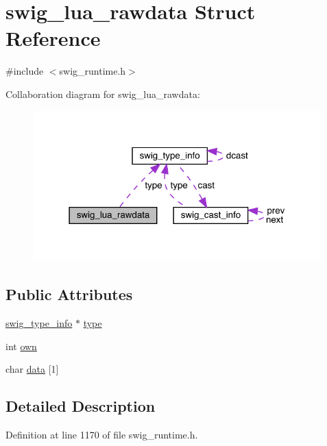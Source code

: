 \hypertarget{structswig__lua__rawdata}{}\section{swig\+\_\+lua\+\_\+rawdata Struct Reference}
\label{structswig__lua__rawdata}


{\ttfamily \#include $<$swig\+\_\+runtime.\+h$>$}



Collaboration diagram for swig\+\_\+lua\+\_\+rawdata\+:\nopagebreak
\begin{figure}[H]
\begin{center}
\leavevmode
\includegraphics[width=316pt]{structswig__lua__rawdata__coll__graph}
\end{center}
\end{figure}
\subsection*{Public Attributes}
\begin{DoxyCompactItemize}
\item 
\mbox{\hyperlink{structswig__type__info}{swig\+\_\+type\+\_\+info}} $\ast$ \mbox{\hyperlink{structswig__lua__rawdata_a935edef9803f54e65acaa0ecf8c81ed2}{type}}
\item 
int \mbox{\hyperlink{structswig__lua__rawdata_ac52566bcb4a7b4d8421c17d182048924}{own}}
\item 
char \mbox{\hyperlink{structswig__lua__rawdata_acbba29d10dcd1b96ba3b8d255b777749}{data}} \mbox{[}1\mbox{]}
\end{DoxyCompactItemize}


\subsection{Detailed Description}


Definition at line 1170 of file swig\+\_\+runtime.\+h.



